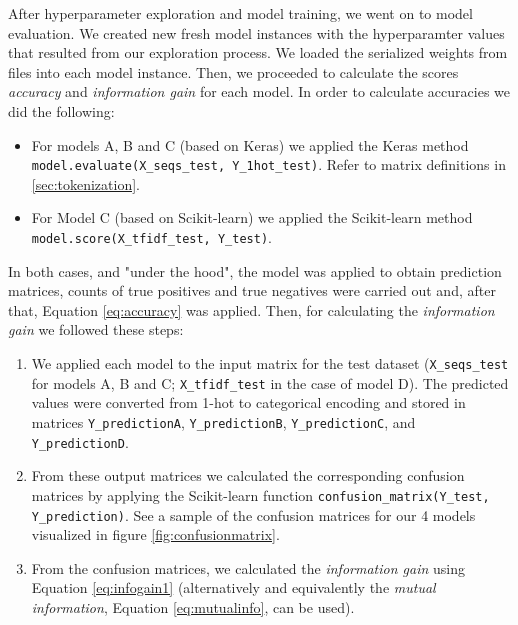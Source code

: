 \documentclass[10pt,journal,compsoc, onecolumn]{IEEEtran}
\begin{document}
After hyperparameter exploration and model training, we went on to model evaluation. We created new fresh model instances with the hyperparamter values that resulted from our exploration process. We loaded the serialized weights from files into each model instance. Then, we proceeded to calculate the scores \textit{accuracy} and \textit{information gain} for each model. In order to calculate accuracies we did the following:

\begin{itemize}
    \item For models A, B and C (based on Keras) we applied the Keras method \verb|model.evaluate(X_seqs_test, Y_1hot_test)|. Refer to matrix definitions in \ref{sec:tokenization}.
    \item For Model C (based on Scikit-learn) we applied the Scikit-learn method \verb|model.score(X_tfidf_test, Y_test)|. 
\end{itemize}

In both cases, and "under the hood", the model was applied to obtain prediction matrices, counts of true positives and true negatives were carried out and, after that, Equation \ref{eq:accuracy} was applied. Then, for calculating the \textit{information gain} we followed these steps:

\begin{enumerate}
    \item We applied each model to the input matrix for the test dataset (\verb|X_seqs_test| for models A, B and C; \verb|X_tfidf_test| in the case of model D). The predicted values were converted from 1-hot to categorical encoding and stored in matrices \verb|Y_predictionA|,  \verb|Y_predictionB|, \verb|Y_predictionC|, and \verb|Y_predictionD|.
    \item From these output matrices we calculated the corresponding confusion matrices by applying the Scikit-learn function \verb|confusion_matrix(Y_test, Y_prediction)|. See a sample of the confusion matrices for our 4 models visualized in figure \ref{fig:confusionmatrix}.
    \item From the confusion matrices, we calculated the \textit{information gain} using Equation \ref{eq:infogain1} (alternatively and equivalently the \textit{mutual information}, Equation \ref{eq:mutualinfo}, can be used).
\end{enumerate}
\end{document}
